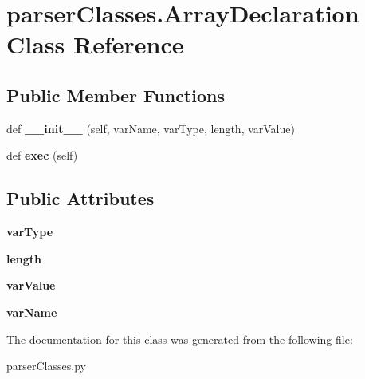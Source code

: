 \hypertarget{classparser_classes_1_1_array_declaration}{}\section{parser\+Classes.\+Array\+Declaration Class Reference}
\label{classparser_classes_1_1_array_declaration}
\subsection*{Public Member Functions}
\begin{DoxyCompactItemize}
\item 
def {\bfseries \+\_\+\+\_\+init\+\_\+\+\_\+} (self, var\+Name, var\+Type, length, var\+Value)\hypertarget{classparser_classes_1_1_array_declaration_aa6752b68bcd3723ff304bf4cf5b24596}{}\label{classparser_classes_1_1_array_declaration_aa6752b68bcd3723ff304bf4cf5b24596}

\item 
def {\bfseries exec} (self)\hypertarget{classparser_classes_1_1_array_declaration_a73740b52f27f696a085be661cffaeabb}{}\label{classparser_classes_1_1_array_declaration_a73740b52f27f696a085be661cffaeabb}

\end{DoxyCompactItemize}
\subsection*{Public Attributes}
\begin{DoxyCompactItemize}
\item 
{\bfseries var\+Type}\hypertarget{classparser_classes_1_1_array_declaration_a17622e66df41a95f9b359700b7f8fbda}{}\label{classparser_classes_1_1_array_declaration_a17622e66df41a95f9b359700b7f8fbda}

\item 
{\bfseries length}\hypertarget{classparser_classes_1_1_array_declaration_a0c2efeb82bc5919dac3811d37ad4d8c9}{}\label{classparser_classes_1_1_array_declaration_a0c2efeb82bc5919dac3811d37ad4d8c9}

\item 
{\bfseries var\+Value}\hypertarget{classparser_classes_1_1_array_declaration_af4dc5a6cf288bce865fd7f198a3b3f71}{}\label{classparser_classes_1_1_array_declaration_af4dc5a6cf288bce865fd7f198a3b3f71}

\item 
{\bfseries var\+Name}\hypertarget{classparser_classes_1_1_array_declaration_a4070f5daf43664847cb46a8d4cafdf56}{}\label{classparser_classes_1_1_array_declaration_a4070f5daf43664847cb46a8d4cafdf56}

\end{DoxyCompactItemize}


The documentation for this class was generated from the following file\+:\begin{DoxyCompactItemize}
\item 
parser\+Classes.\+py\end{DoxyCompactItemize}
